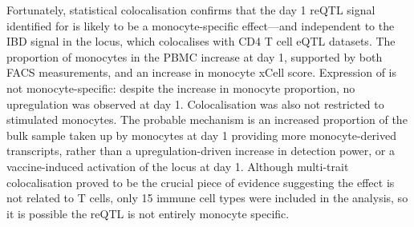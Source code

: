 Fortunately, statistical colocalisation confirms that the day 1 reQTL signal identified for  is likely to be a monocyte-specific effect---and independent to the IBD signal in the locus, which colocalises with CD4 T cell eQTL datasets.
The proportion of monocytes in the PBMC increase at day 1, supported by both FACS \autocite{sobolev2016AdjuvantedInfluenzaH1N1Vaccination} measurements, and an increase in monocyte xCell score.
Expression of  is not monocyte-specific: despite the increase in monocyte proportion, no upregulation was observed at day 1.
Colocalisation was also not restricted to stimulated monocytes.
The probable mechanism is an increased proportion of the bulk sample taken up by monocytes at day 1 providing more monocyte-derived  transcripts,
rather than a upregulation-driven increase in detection power,
or a vaccine-induced activation of the locus at day 1.
Although multi-trait colocalisation proved to be the crucial piece of evidence suggesting the effect is not related to T cells,
only 15 immune cell types were included in the analysis, so it is possible the reQTL is not entirely monocyte specific.

%
%



